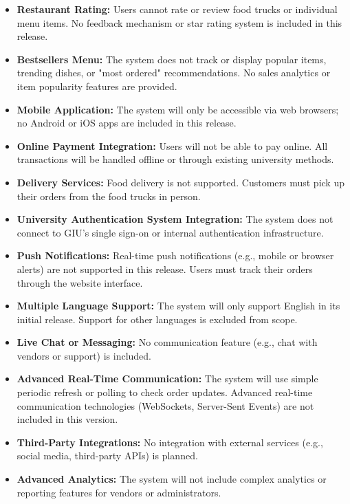 \documentclass[12pt,a4paper]{article}
\begin{document}
\begin{itemize}[leftmargin=2em, itemsep=6pt]
    \item \textbf{Restaurant Rating:} Users cannot rate or review food trucks or individual menu items. No feedback mechanism or star rating system is included in this release.
    \item \textbf{Bestsellers Menu:} The system does not track or display popular items, trending dishes, or "most ordered" recommendations. No sales analytics or item popularity features are provided.
    \item \textbf{Mobile Application:} The system will only be accessible via web browsers; no Android or iOS apps are included in this release.
    \item \textbf{Online Payment Integration:} Users will not be able to pay online. All transactions will be handled offline or through existing university methods.
    \item \textbf{Delivery Services:} Food delivery is not supported. Customers must pick up their orders from the food trucks in person.
    \item \textbf{University Authentication System Integration:} The system does not connect to GIU's single sign-on or internal authentication infrastructure.
    \item \textbf{Push Notifications:} Real-time push notifications (e.g., mobile or browser alerts) are not supported in this release. Users must track their orders through the website interface.
    \item \textbf{Multiple Language Support:} The system will only support English in its initial release. Support for other languages is excluded from scope.
    \item \textbf{Live Chat or Messaging:} No communication feature (e.g., chat with vendors or support) is included.
    \item \textbf{Advanced Real-Time Communication:} The system will use simple periodic refresh or polling to check order updates. Advanced real-time communication technologies (WebSockets, Server-Sent Events) are not included in this version.
    \item \textbf{Third-Party Integrations:} No integration with external services (e.g., social media, third-party APIs) is planned.
    \item \textbf{Advanced Analytics:} The system will not include complex analytics or reporting features for vendors or administrators.
\end{itemize}
\end{document}
